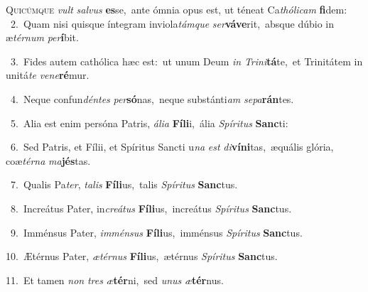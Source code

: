 \lettrine{\initial\textcolor{\initialcolor}{Q}}{uicúmque} \textit{vult} \textit{sal}\-\textit{vus} \textbf{es}\-se,~\star ante ómnia opus est, ut téneat Ca\-\textit{thó}\-\textit{li}\textit{cam} \textbf{fi}\-dem:\\
{\numbfont\textcolor{\numbcolor}{~2.}}~Quam nisi quisque íntegram inviola\-\textit{tám}\-\textit{que} \textit{ser}\-\textbf{vá}\textbf{ve}rit,~\star absque dúbio in æ\-\textit{tér}\-\textit{num} \textit{per}\-\textbf{í}bit.\par
{\numbfont\textcolor{\numbcolor}{~3.}}~Fides autem cathólica hæc est:~\dagger ut unum Deum \textit{in} \textit{Tri}\-\textit{ni}\textbf{tá}te,~\star et Trinitátem in unitá\textit{te} \textit{ve}\-\textit{ne}\textbf{ré}mur.\par
{\numbfont\textcolor{\numbcolor}{~4.}}~Neque confun\-\textit{dén}\-\textit{tes} \textit{per}\-\textbf{só}nas,~\star neque substánti\textit{am} \textit{se}\-\textit{pa}\textbf{rán}tes.\par
{\numbfont\textcolor{\numbcolor}{~5.}}~Alia est enim persóna Patris, \textit{á}\-\textit{li}\textit{a} \textbf{Fí}\-\textbf{li}i,~\star ália \textit{Spí}\-\textit{ri}\textit{tus} \textbf{Sanc}\-ti:\par
{\numbfont\textcolor{\numbcolor}{~6.}}~Sed Patris, et Fílii, et Spíritus Sancti u\textit{na} \textit{est} \textit{di}\-\textbf{ví}\textbf{ni}tas,~\star æquális glória, coæ\-\textit{tér}\-\textit{na} \textit{ma}\-\textbf{jés}tas.\par
{\numbfont\textcolor{\numbcolor}{~7.}}~Qualis Pa\-\textit{ter}\-, \textit{ta}\-\textit{lis} \textbf{Fí}\-\textbf{li}us,~\star talis \textit{Spí}\-\textit{ri}\textit{tus} \textbf{Sanc}\-tus.\par
{\numbfont\textcolor{\numbcolor}{~8.}}~Increátus Pater, in\-\textit{cre}\-\textit{á}\textit{tus} \textbf{Fí}\-\textbf{li}us,~\star increátus \textit{Spí}\-\textit{ri}\textit{tus} \textbf{Sanc}\-tus.\par
{\numbfont\textcolor{\numbcolor}{~9.}}~Imménsus Pater, \textit{im}\-\textit{mén}\textit{sus} \textbf{Fí}\-\textbf{li}us,~\star imménsus \textit{Spí}\-\textit{ri}\textit{tus} \textbf{Sanc}\-tus.\par
{\numbfont\textcolor{\numbcolor}{10.}}~Ætérnus Pater, \textit{æ}\-\textit{tér}\textit{nus} \textbf{Fí}\-\textbf{li}us,~\star ætérnus \textit{Spí}\-\textit{ri}\textit{tus} \textbf{Sanc}\-tus.\par
{\numbfont\textcolor{\numbcolor}{11.}}~Et tamen \textit{non} \textit{tres} \textit{æ}\-\textbf{tér}ni,~\star sed \textit{u}\-\textit{nus} \textit{æ}\-\textbf{tér}nus.\par
